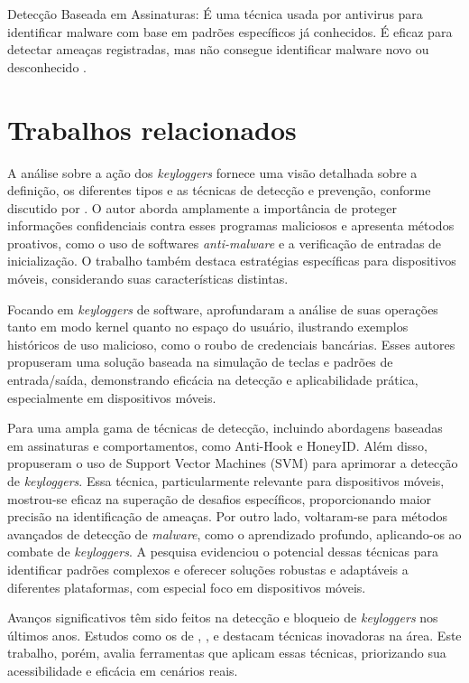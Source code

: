 \documentclass[12pt]{article}
\begin{document}
Detecção Baseada em Assinaturas: É uma técnica usada por antivirus para identificar malware com base em padrões específicos já conhecidos. É eficaz para detectar ameaças registradas, mas não consegue identificar malware novo ou desconhecido \citep{aslan2020comprehensive}.

\section{Trabalhos relacionados}

A análise sobre a ação dos \textit{keyloggers} fornece uma visão detalhada sobre a definição, os diferentes tipos e as técnicas de detecção e prevenção, conforme discutido por \citep{singh2021keylogger}. O autor aborda amplamente a importância de proteger informações confidenciais contra esses programas maliciosos e apresenta métodos proativos, como o uso de softwares \textit{anti-malware} e a verificação de entradas de inicialização. O trabalho também destaca estratégias específicas para dispositivos móveis, considerando suas características distintas.

Focando em \textit{keyloggers} de software, \citep{wajahat2019novel} aprofundaram a análise de suas operações tanto em modo kernel quanto no espaço do usuário, ilustrando exemplos históricos de uso malicioso, como o roubo de credenciais bancárias. Esses autores propuseram uma solução baseada na simulação de teclas e padrões de entrada/saída, demonstrando eficácia na detecção e aplicabilidade prática, especialmente em dispositivos móveis.

Para \citep{solairaj2016keyloggers} uma ampla gama de técnicas de detecção, incluindo abordagens baseadas em assinaturas e comportamentos, como Anti-Hook e HoneyID. Além disso, propuseram o uso de Support Vector Machines (SVM) para aprimorar a detecção de \textit{keyloggers}. Essa técnica, particularmente relevante para dispositivos móveis, mostrou-se eficaz na superação de desafios específicos, proporcionando maior precisão na identificação de ameaças. Por outro lado, \citep{aslan2020comprehensive} voltaram-se para métodos avançados de detecção de \textit{malware}, como o aprendizado profundo, aplicando-os ao combate de \textit{keyloggers}. A pesquisa evidenciou o potencial dessas técnicas para identificar padrões complexos e oferecer soluções robustas e adaptáveis a diferentes plataformas, com especial foco em dispositivos móveis.

Avanços significativos têm sido feitos na detecção e 
bloqueio de \textit{keyloggers} nos últimos anos. Estudos como os de \citep{singh2021keylogger}, 
\citep{wajahat2019novel}, \citep{solairaj2016keyloggers} e \citep{aslan2020comprehensive} destacam técnicas 
inovadoras na área. Este trabalho, porém, avalia ferramentas que aplicam essas técnicas, 
priorizando sua acessibilidade e eficácia em cenários reais.
\end{document}
